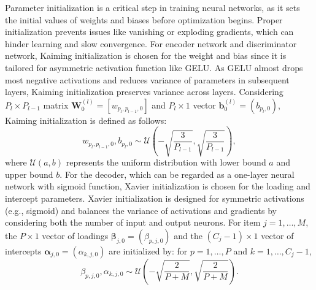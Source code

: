 \documentclass[a4paper,12pt]{article}
\theoremstyle{plain} %
\theoremstyle{remark} %
\theoremstyle{definition} %
\begin{document}
Parameter initialization is a critical step in training neural networks, as it sets the initial values of weights and biases before optimization begins. Proper initialization prevents issues like vanishing or exploding gradients, which can hinder learning and slow convergence. For encoder network and discriminator network, Kaiming initialization \citep{he2015delving} is chosen for the weight and bias since it is tailored for asymmetric activation function like GELU. As GELU almost drops most negative activations and reduces variance of parameters in subsequent layers, Kaiming initialization preserves variance across layers. Considering $P_{l}\times P_{l-1}$ matrix $\bm{W}_0^{(l)}=[w_{p_l,p_{l-1},0}]$ and $P_{l}\times 1$ vector $\bm{b}_0^{(l)}=(b_{p_l,0})$, Kaiming initialization is defined as follows:
\begin{equation}\label{eq:kaiming}
    w_{p_l,p_{l-1},0}, b_{p_l,0} \sim \mathcal{U}\left(-\sqrt{\frac{3}{P_{l-1}}},\sqrt{\frac{3}{P_{l-1}}}\right),
\end{equation}
where $\mathcal{U}(a,b)$ represents the uniform distribution with lower bound $a$ and upper bound $b$. For the decoder, which can be regarded as a one-layer neural network with sigmoid function, Xavier initialization is chosen for the loading and intercept parameters. Xavier initialization \citep{glorot2010understanding} is designed for symmetric activations (e.g., sigmoid) and balances the variance of activations and gradients by considering both the number of input and output neurons. For item $j=1,\dots,M$, the $P\times 1$ vector of loadings $\bm{\beta}_{j,0}=(\beta_{p,j,0})$ and the $(C_j-1)\times 1$ vector of intercepts $\bm{\alpha}_{j,0}=(\alpha_{k,j,0})$ are initialized by: for $p=1,\dots,P$ and $k=1,\dots,C_j-1$,
\begin{equation}\label{eq:xavier}
    \beta_{p,j,0},\alpha_{k,j,0} \sim \mathcal{U}(-\sqrt{\frac{2}{P+M}},\sqrt{\frac{2}{P+M}}).
\end{equation}
\end{document}
